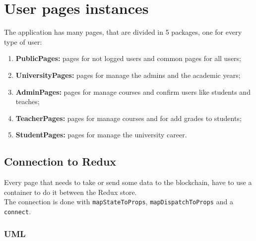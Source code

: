 \documentclass[../react.tex]{subfiles}
\begin{document}
	
	\section{User pages instances}
	The application has many pages, that are divided in 5 packages, one for every type of user:
	\begin{enumerate}
		\item \textbf{PublicPages: } pages for not logged users and common pages for all users;
		\item \textbf{UniversityPages: } pages for manage the admins and the academic years;
		\item \textbf{AdminPages: } pages for manage courses and confirm users like students and teaches;
		\item \textbf{TeacherPages: } pages for manage courses and for add grades to students;
		\item \textbf{StudentPages: } pages for manage the university career.
	\end{enumerate}

	\subsection{Connection to Redux}
	Every page that needs to take or send some data to the blockchain, have to use a container to do it between the Redux store.\\
	The connection is done with \texttt{mapStateToProps}, \texttt{mapDispatchToProps} and a \texttt{connect}.\\

	\subsubsection{UML}
\end{document}
